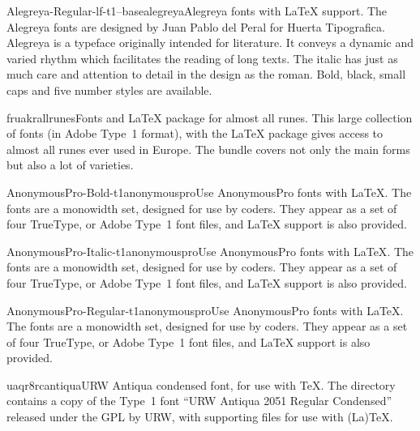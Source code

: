 \documentclass{ddltxtyp}
\begin{document}
\begin{package}{Alegreya-Regular-lf-t1--base}{alegreya}{Alegreya fonts with {\LaTeX} support.}
The Alegreya fonts are designed by Juan Pablo del Peral for
Huerta Tipografica. Alegreya is a typeface originally intended
for literature. It conveys a dynamic and varied rhythm which
facilitates the reading of long texts. The italic has just as
much care and attention to detail in the design as the roman.
Bold, black, small caps and five number styles are available.
\end{package}

\begin{package}{fruakr}{allrunes}{Fonts and {\LaTeX} package for almost all runes.}
This large collection of fonts (in Adobe Type~1 format), with
the {\LaTeX} package gives access to almost all runes ever used in
Europe. The bundle covers not only the main forms but also a
lot of varieties.
\end{package}

\begin{package}{AnonymousPro-Bold-t1}{anonymouspro}{Use AnonymousPro fonts with {\LaTeX}.}
The fonts are a monowidth set, designed for use by coders. They
appear as a set of four TrueType, or Adobe Type~1 font files,
and {\LaTeX} support is also provided.
\end{package}
\begin{package}{AnonymousPro-Italic-t1}{anonymouspro}{Use AnonymousPro fonts with {\LaTeX}.}
The fonts are a monowidth set, designed for use by coders. They
appear as a set of four TrueType, or Adobe Type~1 font files,
and {\LaTeX} support is also provided.
\end{package}
\begin{package}{AnonymousPro-Regular-t1}{anonymouspro}{Use AnonymousPro fonts with {\LaTeX}.}
The fonts are a monowidth set, designed for use by coders. They
appear as a set of four TrueType, or Adobe Type~1 font files,
and {\LaTeX} support is also provided.
\end{package}

\begin{package}{uaqr8rc}{antiqua}{URW Antiqua condensed font, for use with {\TeX}.}
The directory contains a copy of the Type~1 font ``URW Antiqua
2051 Regular Condensed'' released under the GPL by URW, with
supporting files for use with (La){\TeX}.
\end{package}
\end{document}
